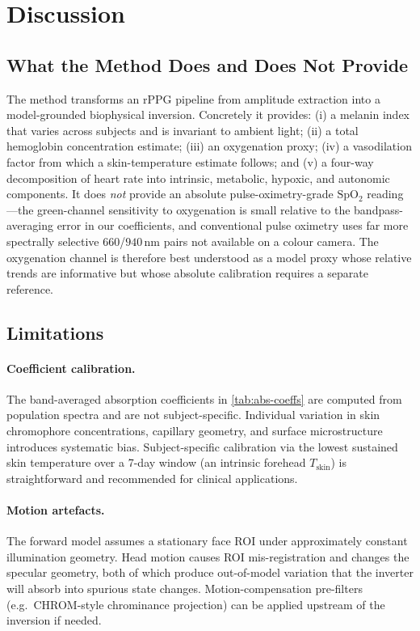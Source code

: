 \documentclass[10pt,twocolumn,a4paper]{article}
\theoremstyle{definition}
\newcommand{\SpO}{\mathrm{SpO_2}}
\newcommand{\Tskin}{T_{\mathrm{skin}}}
\begin{document}
\section{Discussion}\label{sec:discussion}

\subsection{What the Method Does and Does Not Provide}

The method transforms an rPPG pipeline from amplitude extraction into
a model-grounded biophysical inversion. Concretely it provides:
(i) a melanin index that varies across subjects and is invariant to
ambient light; (ii) a total hemoglobin concentration estimate;
(iii) an oxygenation proxy; (iv) a vasodilation factor from which a
skin-temperature estimate follows; and (v) a four-way decomposition
of heart rate into intrinsic, metabolic, hypoxic, and autonomic
components. It does \emph{not} provide an absolute pulse-oximetry-grade
$\SpO$ reading---the green-channel sensitivity to oxygenation is
small relative to the bandpass-averaging error in our coefficients,
and conventional pulse oximetry uses far more spectrally selective
$660$/$940\,\mathrm{nm}$ pairs not available on a colour camera.
The oxygenation channel is therefore best understood as a model
proxy whose relative trends are informative but whose absolute
calibration requires a separate reference.

\subsection{Limitations}

\paragraph{Coefficient calibration.} The band-averaged absorption
coefficients in \cref{tab:abs-coeffs} are computed from population
spectra and are not subject-specific. Individual variation in skin
chromophore concentrations, capillary geometry, and surface
microstructure introduces systematic bias. Subject-specific
calibration via the lowest sustained skin temperature over a 7-day
window (an intrinsic forehead $\Tskin$) is straightforward and
recommended for clinical applications.

\paragraph{Motion artefacts.} The forward model assumes a stationary
face ROI under approximately constant illumination geometry. Head
motion causes ROI mis-registration and changes the specular
geometry, both of which produce out-of-model variation that the
inverter will absorb into spurious state changes.
Motion-compensation pre-filters (e.g.~CHROM-style chrominance
projection) can be applied upstream of the inversion if needed.
\end{document}
